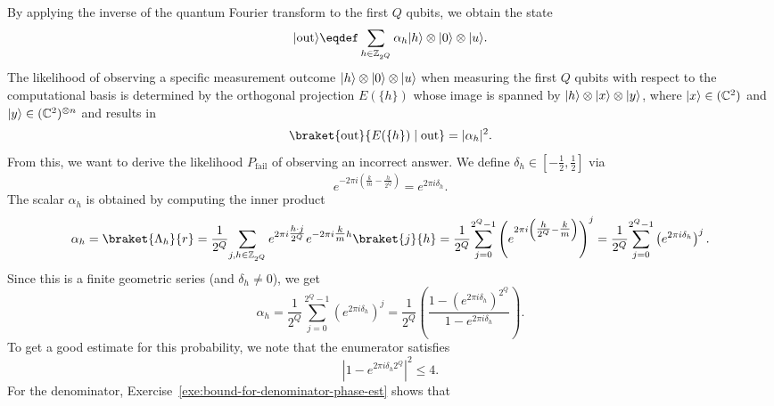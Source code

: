 \documentclass[a4paper, oneside, 12pt]{amsart}
\begin{document}
\begin{remark}
  By applying the inverse of the quantum Fourier transform to the first \(Q\) qubits, we obtain the state
  \begin{equation*}
    \ket{\mathrm{out}} \eqdef  \sum_{h\in \mathbb{Z}_{2^{Q}}} \alpha_{h} \ket{h}  \otimes \ket{0} \otimes \ket{u}.
  \end{equation*}
  The likelihood of observing a specific measurement outcome \(\lvert h\rangle\otimes \lvert0\rangle \otimes \lvert u\rangle\) when measuring the first \(Q\) qubits with respect to the computational basis is determined by the orthogonal projection \(E(\{h\})\) whose image is spanned by \(\lvert h\rangle\otimes \lvert x\rangle \otimes \lvert y\rangle\), where \(\lvert x\rangle\in (\mathbb{C}^2)\) and \(\lvert y\rangle\in (\mathbb{C}^2)^{\otimes n}\) and results in
  \begin{equation*}
    \braket{\mathrm{out}}{E(\{h\})\mid \mathrm{out}} = |\alpha_{h}|^{2}.
  \end{equation*}
  From this, we want to derive the likelihood \(P_{\mathrm{fail}}\) of observing an incorrect answer.
  We define \(\delta_{h}\in [-\tfrac{1}{2}, \tfrac{1}{2}]\) via
  \begin{equation*}
    e^{-2\pi i \left(\tfrac{k}{m}- \tfrac{h}{2^Q}\right)} = e^{2\pi i \delta_{h}}.
  \end{equation*}
  The scalar \(\alpha_{h}\) is obtained by computing the inner product
  \begin{equation*}
    \alpha_h = \braket{\Lambda_{h}}{r}
    = \frac{1}{2^Q} \!\sum_{j,h \in \mathbb{Z}_{2^Q} } e^{2\pi i \tfrac{h \cdot j}{2^Q}}e^{-2\pi i\tfrac{k}{m}h} \braket{j}{h}
    = \frac{1}{2^Q} \!\sum_{j=0}^{2^Q-1} \left(e^{2\pi i \left(\tfrac{h}{2^{Q}} - \tfrac{k}{m}\right)}\right)^j
    = \frac{1}{2^Q} \!\sum_{j=0}^{2^Q-1} \left(e^{2\pi i \delta_{h}}\right)^j.
  \end{equation*}
  Since this is a finite geometric series (and \(\delta_{h}\neq 0\)), we get
  \begin{equation*}
    \alpha_{h}  = \frac{1}{2^Q} \sum_{j=0}^{2^Q-1} \left(e^{2\pi i \delta_{h}}\right)^j = \frac{1}{2^Q} \left( \frac{1 - \left({e^{2\pi i \delta_{h}}}\right)^{2^{Q}}}{1 - e^{2\pi i \delta_{h}}} \right).
  \end{equation*}
  To get a good estimate for this probability, we note that the enumerator satisfies
  \begin{equation*}
    |1 - e^{2\pi i \delta_h 2^Q}|^2 \leq 4.
  \end{equation*}
  For the denominator, Exercise~\ref{exe:bound-for-denominator-phase-est} shows that
  \begin{equation*}

\end{equation*}
\end{remark}
\end{document}
